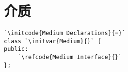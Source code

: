 \section{介质}\label{sec:介质}

\begin{lstlisting}
`\initcode{Medium Declarations}{=}`
class `\initvar{Medium}{}` {
public:
    `\refcode{Medium Interface}{}`
};
\end{lstlisting}